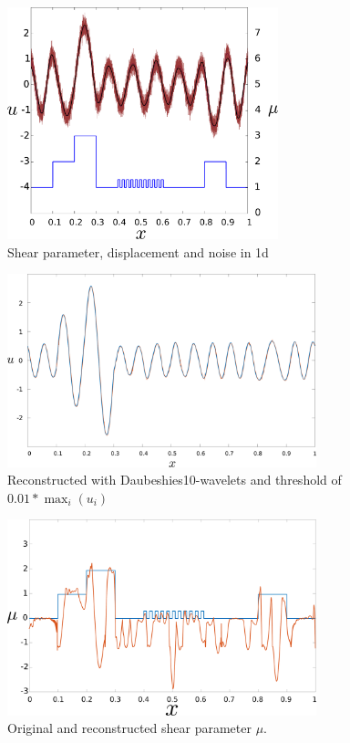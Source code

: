 \begin{frame}
 
 \begin{figure}
\includegraphics[width=0.7\textwidth]{Images/waveDenoising.pdf}
\centering
\caption{Shear parameter, displacement and noise in 1d}
\end{figure}
\end{frame}

\begin{frame}
 \begin{figure}
\includegraphics[width=0.8\textwidth]{Images/littleSpikes.pdf}
\caption{Reconstructed with Daubeshies10-wavelets and threshold of $0.01*\max_i(u_i)$}
\centering
\end{figure}
\end{frame}

\begin{frame}
 \begin{figure}
\includegraphics[width=0.8\textwidth]{Images/muCorrupted.pdf}
\centering
\caption{Original and reconstructed shear parameter $\mu$.}
\end{figure}
\end{frame}

